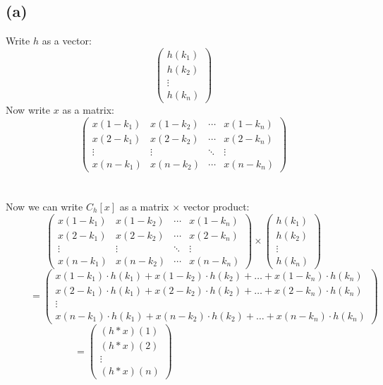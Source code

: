 \documentclass[12pt]{article}
\begin{document}
\subsection*{(a)}
Write $h$ as a vector:
\[
\begin{pmatrix}
h(k_{1})\\
h(k_{2})\\
\vdots\\
h(k_{n})
\end{pmatrix}
\]
Now write $x$ as a matrix:
\[
\begin{pmatrix}
x(1-k_{1}) & x(1-k_{2}) & \cdots & x(1-k_{n})\\
x(2-k_{1}) & x(2-k_{2}) & \cdots & x(2-k_{n})\\
\vdots & \vdots & \ddots & \vdots\\
x(n-k_{1}) & x(n-k_{2}) & \cdots & x(n-k_{n})
\end{pmatrix}
\]
\\\\Now we can write $C_{h}[x]$ as a matrix $\times$ vector product:
\[
\begin{pmatrix}
x(1-k_{1}) & x(1-k_{2}) & \cdots & x(1-k_{n})\\
x(2-k_{1}) & x(2-k_{2}) & \cdots & x(2-k_{n})\\
\vdots & \vdots & \ddots & \vdots\\
x(n-k_{1}) & x(n-k_{2}) & \cdots & x(n-k_{n})
\end{pmatrix} \times \begin{pmatrix}
h(k_{1})\\
h(k_{2})\\
\vdots\\
h(k_{n})
\end{pmatrix}
\]
\[
~~~~~~~~~~~= \begin{pmatrix}
x(1-k_{1}) \cdot h(k_{1}) + x(1-k_{2}) \cdot h(k_{2}) + \ldots + x(1-k_{n}) \cdot h(k_{n})\\
x(2-k_{1}) \cdot h(k_{1}) + x(2-k_{2}) \cdot h(k_{2}) + \ldots + x(2-k_{n}) \cdot h(k_{n})\\
\vdots\\
x(n-k_{1}) \cdot h(k_{1}) + x(n-k_{2}) \cdot h(k_{2}) + \ldots + x(n-k_{n}) \cdot h(k_{n})
\end{pmatrix}
\]
\[
= \begin{pmatrix}
(h*x)(1)\\
(h*x)(2)\\
\vdots\\
(h*x)(n)
\end{pmatrix}~~~~~~~~~~~~~~~~~~~~~~~~~~~~~~~~~~~~~~~~~~~~~~~~~~~~~~~
\]
\end{document}
